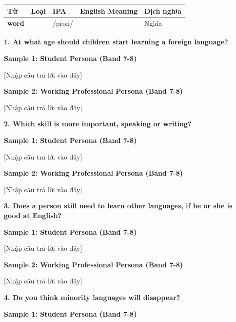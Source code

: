 \vspace{0.8em}
\begin{center}
\renewcommand{\arraystretch}{1.65}
\begin{tabularx}{\textwidth}{|V{0.22\textwidth}|C{0.07\textwidth}|I{0.20\textwidth}|Y|V{0.18\textwidth}|}
\hline
{}
\textbf{Từ} & \textbf{Loại} & \textbf{IPA} & \textbf{English Meaning} & \textbf{Dịch nghĩa} \\
\hline
\textbf{word} & & /pron/ & & Nghĩa \\ \hline
\end{tabularx}
\end{center}

\partthreeheader

\begin{ieltsquestion}
\textbf{1. At what age should children start learning a foreign language?}
\end{ieltsquestion}
\textbf{Sample 1: Student Persona (Band 7-8)}

[Nhập câu trả lời vào đây]

\textbf{Sample 2: Working Professional Persona (Band 7-8)}

[Nhập câu trả lời vào đây]

\separator

\begin{ieltsquestion}
\textbf{2. Which skill is more important, speaking or writing?}
\end{ieltsquestion}
\textbf{Sample 1: Student Persona (Band 7-8)}

[Nhập câu trả lời vào đây]

\textbf{Sample 2: Working Professional Persona (Band 7-8)}

[Nhập câu trả lời vào đây]

\separator

\begin{ieltsquestion}
\textbf{3. Does a person still need to learn other languages, if he or she is good at English?}
\end{ieltsquestion}
\textbf{Sample 1: Student Persona (Band 7-8)}

[Nhập câu trả lời vào đây]

\textbf{Sample 2: Working Professional Persona (Band 7-8)}

[Nhập câu trả lời vào đây]

\separator

\begin{ieltsquestion}
\textbf{4. Do you think minority languages will disappear?}
\end{ieltsquestion}
\textbf{Sample 1: Student Persona (Band 7-8)}

